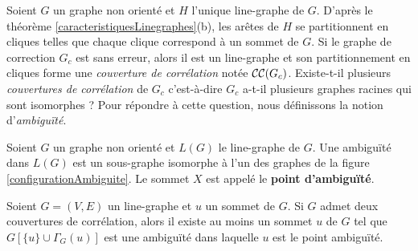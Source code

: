 Soient $G$ un graphe non orient\'e et $H$ l'unique  line-graphe de $G$.
D'apr\`es le th\'eor\`eme \ref{caracteristiquesLinegraphes}(b), les ar\^etes de $H$ se partitionnent en cliques telles que chaque clique correspond \`a un sommet de $G$. 
\newline
Si le graphe de correction $G_c$ est sans erreur, alors il est un line-graphe et son partitionnement en cliques forme une {\em couverture de corr\'elation} not\'ee ${\cal CC}(G_c)$.
Existe-t-il plusieurs {\em couvertures de corr\'elation} de $G_c$ c'est-\`a-dire $G_c$ a-t-il plusieurs graphes racines qui sont isomorphes ?
Pour r\'epondre \`a cette question, nous d\'efinissons la notion d'{\em ambigu\"{i}t\'e}. 
\newline

\begin{definition}
Soient $G$ un graphe non orient\'e et $L(G)$ le line-graphe de $G$. 
\newline
Une ambigu\"{i}t\'e dans $L(G)$ est un sous-graphe isomorphe \`a l'un des graphes de la figure \ref{configurationAmbiguite}. Le sommet $X$ est appel\'e le {\bf point d'ambigu\"{i}t\'e}.
\end{definition}

\begin{lemma}
	Soient $G = (V,E)$ un line-graphe  et $u$ un sommet de $G$. 
	\newline
	Si $G$ admet deux couvertures de corr\'elation, alors il existe au moins un sommet $u$ de $G$ tel que $G[\{u\} \cup \Gamma_{G}(u)]$ est une ambigu\"{i}t\'e dans laquelle $u$ est le point ambigu\"{i}t\'e.
\end{lemma}
	
